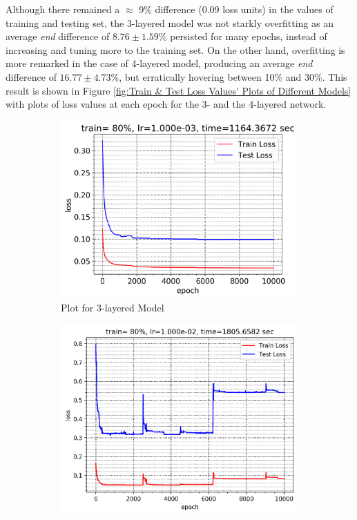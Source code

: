 \documentclass[12pt]{article}
\begin{document}
    Although there remained a $\approx$ 9\% difference (0.09 loss units) in the values of training and testing set, the 3-layered model was not starkly overfitting as an average \textit{end} difference of $8.76\pm1.59\%$ persisted for many epochs, instead of increasing and tuning more to the training set. On the other hand, overfitting is more remarked in the case of 4-layered model, producing an average \textit{end} difference of $16.77 \pm 4.73\%$, but erratically hovering between 10\% and 30\%. This result is shown in Figure \ref{fig:Train & Test Loss Values' Plots of Different Models} with plots of loss values at each epoch for the 3- and the 4-layered network.
    \begin{figure}[!htbp]
        \centering
        \begin{subfigure}{.49\textwidth}
            \centering
            \includegraphics[width=\textwidth]{weights_train_test_loss_3_plot}
            \caption{Plot for 3-layered Model}
            \label{fig:Plot for 3-layered Model}
        \end{subfigure}
        \begin{subfigure}{.49\textwidth}
            \centering
            \includegraphics[width=\textwidth]{weights_train_test_loss_4_plot}

\end{subfigure}
\end{figure}
\end{document}
